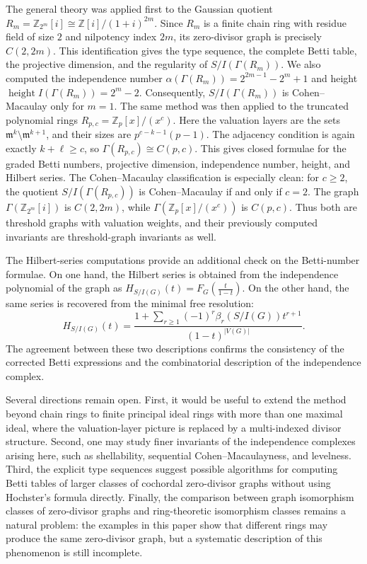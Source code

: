 \documentclass[12pt]{article}
\theoremstyle{definition}
\begin{document}
\medskip

The general theory was applied first to the Gaussian quotient $ R_m=\mathbb Z_{2^m}[i]\cong \mathbb Z[i]/(1+i)^{2m}. $
Since $R_m$ is a finite chain ring with residue field of size $2$ and nilpotency index $2m$, its zero-divisor graph is precisely $C(2,2m)$.  This identification gives the type sequence, the complete Betti table, the projective dimension, and the regularity of $S/I(\Gamma(R_m))$.  We also computed the independence number $\alpha(\Gamma(R_m))=2^{2m-1}-2^m+1$ and height $\operatorname{height} I(\Gamma(R_m))=2^m-2.$ Consequently, $S/I(\Gamma(R_m))$ is Cohen--Macaulay only for $m=1$.
 The same method was then applied to the truncated polynomial rings $ R_{p,c}=\mathbb Z_p[x]/(x^c). $
Here the valuation layers are the sets $\mathfrak m^k\setminus\mathfrak m^{k+1}$, and their sizes are $p^{c-k-1}(p-1)$.  The adjacency condition is again exactly $k+\ell\ge c$, so $\Gamma(R_{p,c})\cong C(p,c)$.  This gives closed formulae for the graded Betti numbers, projective dimension, independence number, height, and Hilbert series.  The Cohen--Macaulay classification is especially clean: for $c\ge2$, the quotient $S/I(\Gamma(R_{p,c}))$ is Cohen--Macaulay if and only if $c=2$.
The graph $\Gamma(\mathbb Z_{2^m}[i])$ is $C(2,2m)$, while $\Gamma(\mathbb Z_p[x]/(x^c))$ is $C(p,c)$.  Thus both are threshold graphs with valuation weights, and their previously computed invariants are threshold-graph invariants as well.
\medskip

The Hilbert-series computations provide an additional check on the Betti-number formulae.  On one hand, the Hilbert series is obtained from the independence polynomial of the graph as 
$ H_{S/I(G)}(t)=F_G\left(\frac{t}{1-t}\right). $
On the other hand, the same series is recovered from the minimal free resolution:
$$
H_{S/I(G)}(t)=
\frac{1+\sum_{r\ge1}(-1)^r\beta_r(S/I(G))t^{r+1}}{(1-t)^{|V(G)|}}.
$$
The agreement between these two descriptions confirms the consistency of the corrected Betti expressions and the combinatorial description of the independence complex.

\medskip

Several directions remain open.  First, it would be useful to extend the method beyond chain rings to finite principal ideal rings with more than one maximal ideal, where the valuation-layer picture is replaced by a multi-indexed divisor structure.  Second, one may study finer invariants of the independence complexes arising here, such as shellability, sequential Cohen--Macaulayness, and levelness.  Third, the explicit type sequences suggest possible algorithms for computing Betti tables of larger classes of cochordal zero-divisor graphs without using Hochster's formula directly.  Finally, the comparison between graph isomorphism classes of zero-divisor graphs and ring-theoretic isomorphism classes remains a natural problem: the examples in this paper show that different rings may produce the same zero-divisor graph, but a systematic description of this phenomenon is still incomplete.
\end{document}
